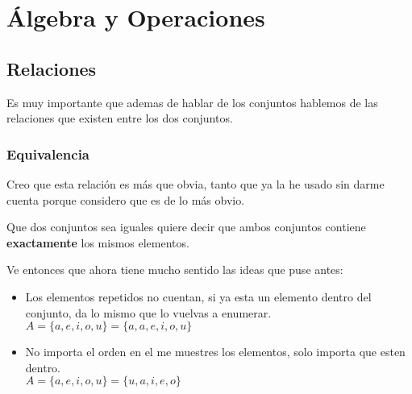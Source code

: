 \documentclass[12pt]{report}                                    %
\begin{document}
    \chapter{Álgebra y Operaciones}
        \clearpage


        \clearpage
        \section{Relaciones}

            Es muy importante que ademas de hablar de los conjuntos hablemos de las relaciones
            que existen entre los dos conjuntos.


            \subsection{Equivalencia}

                Creo que esta relación es más que obvia, tanto que ya la he usado sin darme cuenta
                porque considero que es de lo más obvio.

                Que dos conjuntos sea iguales quiere decir que ambos conjuntos contiene \textbf{exactamente}
                los mismos elementos.

                Ve entonces que ahora tiene mucho sentido las ideas que puse antes:

                \begin{itemize}
                    \item Los elementos repetidos no cuentan, si ya esta un elemento dentro del
                        conjunto, da lo mismo que lo vuelvas a enumerar.\\
                        $A = \{a, e, i, o, u\} = \{a, a, e, i, o, u\}$

                    \item No importa el orden en el me muestres los elementos,
                        solo importa que esten dentro.\\
                        $A = \{a, e, i, o, u\} = \{u, a, i, e, o\}$
                \end{itemize}
\end{document}
